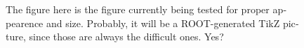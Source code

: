 

\begin{english}


\begin{figure}

\centering
\begin{minipage}{.69\textwidth}
\begin{infilsf} \tiny

\end{infilsf}
\end{minipage}
\caption{The figure here is the figure currently being tested for
  proper appearence and size. Probably, it will be a ROOT-generated
  TikZ picture, since those are always the difficult ones. Yes?}
\label{fig:my_label}
\end{figure}



\end{english}

